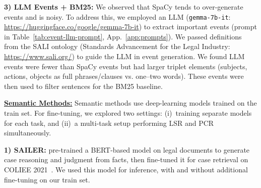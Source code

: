 \noindent\textbf{3) LLM Events + BM25:} We observed that SpaCy tends to over-generate events and is noisy. To address this, we employed an LLM (\texttt{gemma-7b-it}: \url{https://huggingface.co/google/gemma-7b-it}) to extract important events (prompt in Table~\ref{tab:event-llm-prompt}, App.~\ref{app:prompts}). We passed definitions from the SALI ontology (Standards Advancement for the Legal Industry: \url{https://www.sali.org/}) to guide the LLM in event generation. 
We found LLM events were fewer than SpaCy events but had larger triplet elements (subjects, actions, objects as full phrases/clauses vs. one–two words). These events were then used to filter sentences for the BM25 baseline.

\vspace{1mm}
\noindent\underline{\textbf{Semantic Methods:}}
Semantic methods use deep-learning models trained on the train set. For fine-tuning, we explored two settings: (i)~training separate models for each task, and (ii)~a multi-task setup performing LSR and PCR simultaneously.

\noindent \textbf{1) SAILER:} \citet{li2023sailer} pre-trained a BERT-based model on legal documents to generate case reasoning and judgment from facts, then fine-tuned it for case retrieval on COLIEE 2021~\citep{rabelo2022coliee21}. We used this model for inference, with and without additional fine-tuning on our train set.


